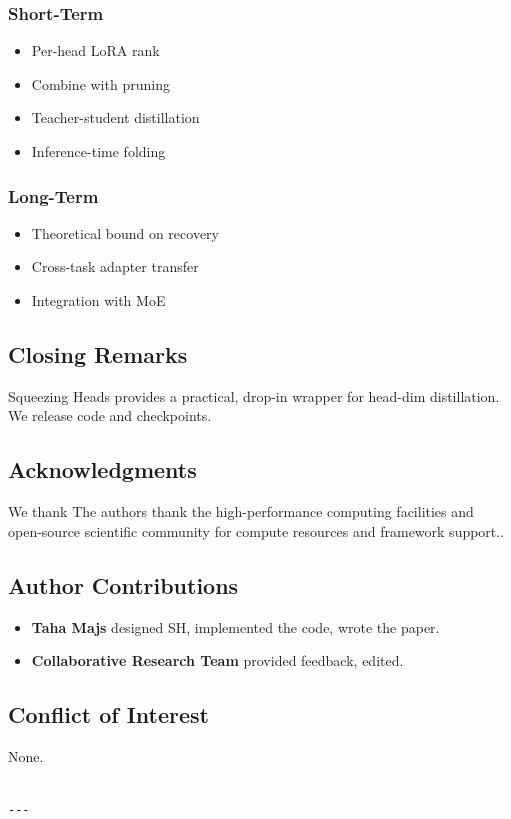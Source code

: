 \subsubsection{Short-Term}
\begin{itemize}
\item Per-head LoRA rank
\item Combine with pruning
\item Teacher-student distillation
\item Inference-time folding

\end{itemize}
\subsubsection{Long-Term}
\begin{itemize}
\item Theoretical bound on recovery
\item Cross-task adapter transfer
\item Integration with MoE

\end{itemize}
\subsection{Closing Remarks}

Squeezing Heads provides a practical, drop-in wrapper for head-dim 
distillation. We release code and checkpoints.

\subsection{Acknowledgments}

We thank The authors thank the high-performance computing facilities and open-source scientific community for compute resources and framework support..

\subsection{Author Contributions}

\begin{itemize}
\item \textbf{Taha Majs} designed SH, implemented the code, wrote the paper.
\item \textbf{Collaborative Research Team} provided feedback, edited.

\end{itemize}
\subsection{Conflict of Interest}

None.
\begin{lstlisting}

---
\end{lstlisting}